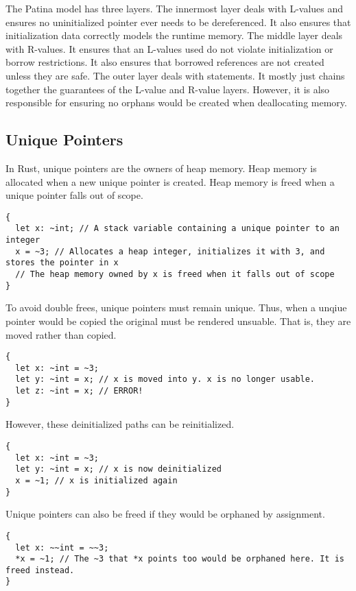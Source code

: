 The Patina model has three layers.
The innermost layer deals with L-values and ensures no uninitialized pointer
ever needs to be dereferenced. It also ensures that initialization data correctly
models the runtime memory.
The middle layer deals with R-values.
It ensures that an L-values used do not violate initialization or borrow restrictions.
It also ensures that borrowed references are not created unless they are safe.
The outer layer deals with statements.
It mostly just chains together the guarantees of the L-value and R-value layers.
However, it is also responsible for ensuring no orphans would be created when deallocating memory.

\subsection*{Unique Pointers}
In Rust, unique pointers are the owners of heap memory.
Heap memory is allocated when a new unique pointer is created.
Heap memory is freed when a unique pointer falls out of scope.
\begin{verbatim}
{
  let x: ~int; // A stack variable containing a unique pointer to an integer
  x = ~3; // Allocates a heap integer, initializes it with 3, and stores the pointer in x
  // The heap memory owned by x is freed when it falls out of scope
}
\end{verbatim}

To avoid double frees, unique pointers must remain unique.
Thus, when a unqiue pointer would be copied the original must be rendered unsuable.
That is, they are moved rather than copied.
\begin{verbatim}
{
  let x: ~int = ~3;
  let y: ~int = x; // x is moved into y. x is no longer usable.
  let z: ~int = x; // ERROR!
}
\end{verbatim}

However, these deinitialized paths can be reinitialized.
\begin{verbatim}
{
  let x: ~int = ~3;
  let y: ~int = x; // x is now deinitialized
  x = ~1; // x is initialized again
}
\end{verbatim}

Unique pointers can also be freed if they would be orphaned by assignment.
\begin{verbatim}
{
  let x: ~~int = ~~3;
  *x = ~1; // The ~3 that *x points too would be orphaned here. It is freed instead.
}
\end{verbatim}

